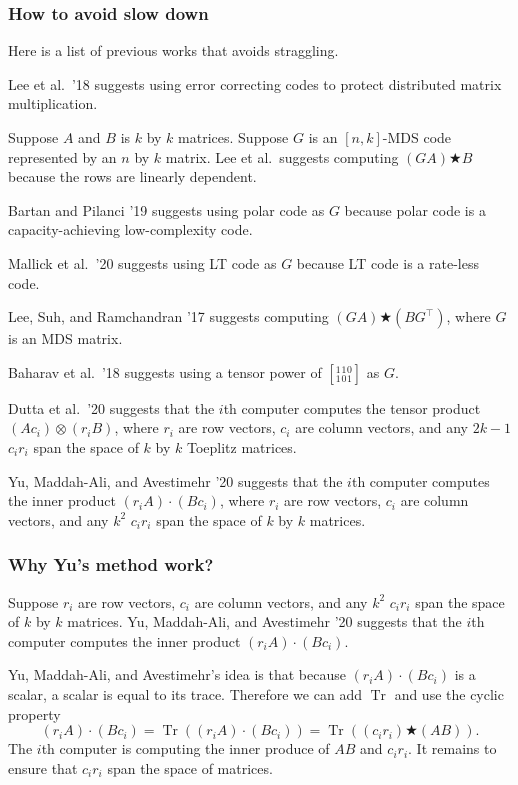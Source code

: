 \documentclass[aspectratio=169, t]{beamer}
\DeclareMathOperator\Tr{Tr}
\begin{document}
\begin{frame}
	\frametitle{How to avoid slow down}

	Here is a list of previous works that avoids straggling.

	Lee et al.\ '18 suggests using error correcting codes
	to protect distributed matrix multiplication.

	Suppose $A$ and $B$ is $k$ by $k$ matrices.
	Suppose $G$ is an $[n, k]$-MDS code represented by an $n$ by $k$ matrix.
	Lee et al.\ suggests
	computing $(G A) \bigstar B$ because the rows are linearly dependent.

	\pause

	Bartan and Pilanci '19 suggests using polar code as $G$
	because polar code is a capacity-achieving low-complexity code.

	
	\pause

	Mallick et al.\ '20 suggests using LT code as $G$
	because LT code is a rate-less code.
\end{frame}

\begin{frame}
	Lee, Suh, and Ramchandran '17 suggests computing
	$(G A) \bigstar (B G^\top)$, where $G$ is an MDS matrix.

	\pause

	Baharav et al.\ '18 suggests using
	a tensor power of $[^1_1{}^1_0{}^0_1]$ as $G$.

	\pause

	Dutta et al.\ '20 suggests that the $i$th computer
	computes the tensor product $(A c_i) \otimes (r_i B)$,
	where $r_i$ are row vectors, $c_i$ are column vectors,
	and any $2k-1$ $c_i r_i$ span the space of $k$ by $k$ Toeplitz matrices.

	\pause

	Yu, Maddah-Ali, and Avestimehr '20 suggests that
	the $i$th computer computes the inner product $(r_i A) \cdot (B c_i)$,
	where $r_i$ are row vectors, $c_i$ are column vectors,
	and any $k^2$ $c_i r_i$ span the space of $k$ by $k$ matrices.
\end{frame}

\begin{frame}
	\frametitle{Why Yu's method work?}

	Suppose $r_i$ are row vectors, $c_i$ are column vectors,
	and any $k^2$ $c_i r_i$ span the space of $k$ by $k$ matrices.
	Yu, Maddah-Ali, and Avestimehr '20 suggests that
	the $i$th computer computes the inner product $(r_i A) \cdot (B c_i)$.

	Yu, Maddah-Ali, and Avestimehr's idea is that
	because $(r_i A) \cdot (B c_i)$ is a scalar,
	a scalar is equal to its trace.
	Therefore we can add $\Tr$ and use the cyclic property
	\[
		(r_i A) \cdot (B c_i)
		= \Tr((r_i A) \cdot (B c_i))
		= \Tr((c_i r_i) \bigstar (A B)).
	\]
	The $i$th computer is computing the inner produce of $A B$ and $c_i r_i$.
	It remains to ensure that $c_i r_i$ span the space of matrices.
\end{frame}
\end{document}
